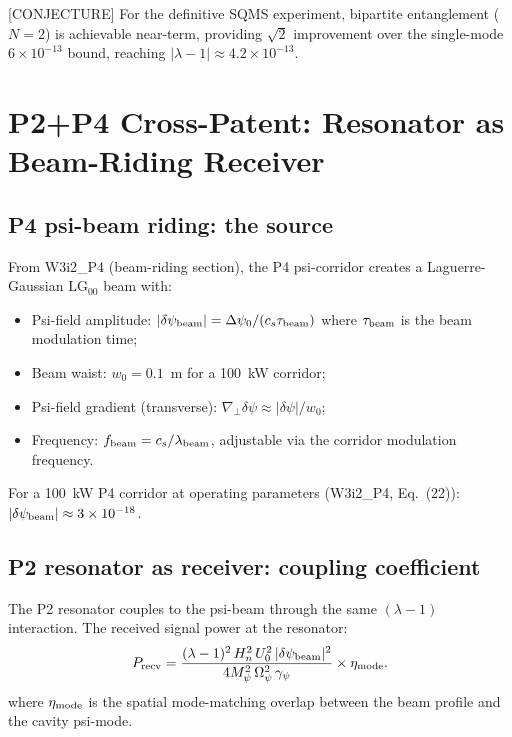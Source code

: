 \documentclass[11pt,twocolumn]{article}
\newcommand{\dpsi}{\delta\psi}
\newcommand{\lam}{\lambda}
\newcommand{\Opsi}{\Omega_\psi}
\newcommand{\gpsi}{\gamma_\psi}
\newcommand{\Mpsi}{M_\psi}
\newcommand{\ee}[1]{\times 10^{#1}}
\theoremstyle{definition}
\theoremstyle{remark}
\begin{document}
[CONJECTURE] For the definitive SQMS experiment, bipartite entanglement
($N = 2$) is achievable near-term, providing $\sqrt{2}$ improvement
over the single-mode $6\ee{-13}$ bound, reaching $|\lam-1| \approx 4.2\ee{-13}$.

\section{P2+P4 Cross-Patent: Resonator as Beam-Riding Receiver}
\label{sec:P4}

\subsection{P4 psi-beam riding: the source}
\label{sec:P4_source}

From W3i2\_P4 (beam-riding section), the P4 psi-corridor creates a
Laguerre-Gaussian $\mathrm{LG}_{00}$ beam with:
\begin{itemize}[nosep]
\item Psi-field amplitude: $|\dpsi_{\rm beam}| = \Delta\psi_0/(c_s\tau_{\rm beam})$
      where $\tau_{\rm beam}$ is the beam modulation time;
\item Beam waist: $w_0 = 0.1$~m for a 100~kW corridor;
\item Psi-field gradient (transverse): $\nabla_\perp\dpsi \approx |\dpsi|/w_0$;
\item Frequency: $f_{\rm beam} = c_s/\lambda_{\rm beam}$, adjustable via the
      corridor modulation frequency.
\end{itemize}

For a 100~kW P4 corridor at operating parameters (W3i2\_P4,
Eq.~(22)): $|\dpsi_{\rm beam}| \approx 3\ee{-18}$.

\subsection{P2 resonator as receiver: coupling coefficient}
\label{sec:P4_coupling}

The P2 resonator couples to the psi-beam through the same
$(\lam-1)$ interaction.  The received signal power at the resonator:
\begin{equation}
P_{\rm recv} = \frac{(\lam-1)^2\,H_n^2\,U_0^2\,|\dpsi_{\rm beam}|^2}
{4\Mpsi^2\,\Opsi^2\,\gpsi}\times\eta_{\rm mode}.
\label{eq:P_recv}
\end{equation}
where $\eta_{\rm mode}$ is the spatial mode-matching overlap between
the beam profile and the cavity psi-mode.
\end{document}
